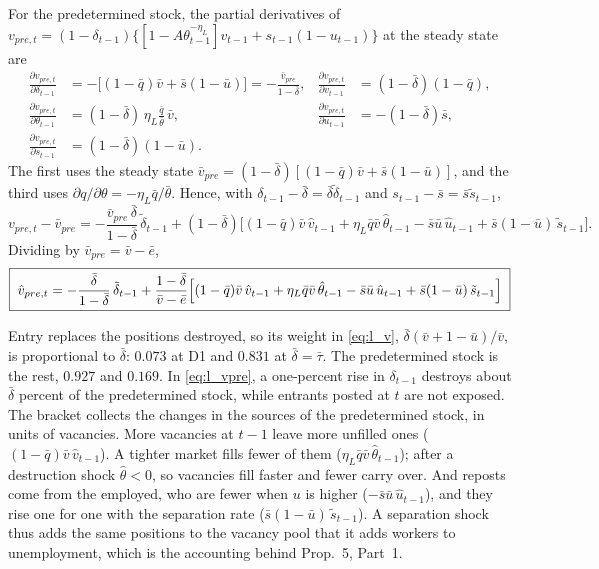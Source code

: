 \documentclass[authoryear, review, 12pt]{elsarticle}
\begin{document}
For the predetermined stock, the partial derivatives of
$v_{pre,t}=(1-\delta_{t-1})\{[1-A\theta_{t-1}^{-\eta_L}]v_{t-1}+s_{t-1}(1-u_{t-1})\}$ at the
steady state are
\begin{align*}
	\frac{\partial v_{pre,t}}{\partial\delta_{t-1}}&=-\bigl[(1-\bar q)\bar v+\bar s(1-\bar u)\bigr]
	=-\frac{\bar v_{pre}}{1-\bar\delta},
	&\frac{\partial v_{pre,t}}{\partial v_{t-1}}&=(1-\bar\delta)(1-\bar q),\\
	\frac{\partial v_{pre,t}}{\partial\theta_{t-1}}&=(1-\bar\delta)\,\eta_L\frac{\bar q}{\bar\theta}\,\bar v,
	&\frac{\partial v_{pre,t}}{\partial u_{t-1}}&=-(1-\bar\delta)\bar s,\\
	\frac{\partial v_{pre,t}}{\partial s_{t-1}}&=(1-\bar\delta)(1-\bar u).
\end{align*}
The first uses the steady state $\bar v_{pre}=(1-\bar\delta)[(1-\bar q)\bar v+\bar s(1-\bar u)]$,
and the third uses $\partial q/\partial\theta=-\eta_L\bar q/\bar\theta$. Hence, with
$\delta_{t-1}-\bar\delta=\bar\delta\tilde\delta_{t-1}$ and $s_{t-1}-\bar s=\bar s\tilde s_{t-1}$,
\[
	v_{pre,t}-\bar v_{pre}
	=-\frac{\bar v_{pre}\,\bar\delta}{1-\bar\delta}\,\tilde\delta_{t-1}
	+(1-\bar\delta)\bigl[(1-\bar q)\bar v\,\hat v_{t-1}+\eta_L\bar q\bar v\,\hat\theta_{t-1}
	-\bar s\bar u\,\hat u_{t-1}+\bar s(1-\bar u)\,\tilde s_{t-1}\bigr].
\]
Dividing by $\bar v_{pre}=\bar v-\bar e$,
\begin{equation}\label{eq:l_vpre}
	\boxed{\;
	\hat v_{pre,t}=-\frac{\bar\delta}{1-\bar\delta}\,\tilde\delta_{t-1}
	+\frac{1-\bar\delta}{\bar v-\bar e}\Bigl[(1-\bar q)\bar v\,\hat v_{t-1}
	+\eta_L\bar q\bar v\,\hat\theta_{t-1}-\bar s\bar u\,\hat u_{t-1}
	+\bar s(1-\bar u)\,\tilde s_{t-1}\Bigr]\;}
\end{equation}

Entry replaces the positions destroyed, so its weight in \eqref{eq:l_v},
$\bar\delta(\bar v+1-\bar u)/\bar v$, is proportional to $\bar\delta$: $0.073$ at D1 and
$0.831$ at $\bar\delta=\bar\tau$. The predetermined stock is the rest, $0.927$ and $0.169$.
In \eqref{eq:l_vpre}, a one-percent rise in $\delta_{t-1}$ destroys about $\bar\delta$
percent of the predetermined stock, while entrants posted at $t$ are not exposed. The
bracket collects the changes in the sources of the predetermined stock, in units of
vacancies. More vacancies at $t-1$ leave more unfilled ones ($(1-\bar q)\bar v\,\hat v_{t-1}$).
A tighter market fills fewer of them ($\eta_L\bar q\bar v\,\hat\theta_{t-1}$); after a
destruction shock $\hat\theta<0$, so vacancies fill faster and fewer carry over. And reposts
come from the employed, who are fewer when $u$ is higher ($-\bar s\bar u\,\hat u_{t-1}$), and
they rise one for one with the separation rate ($\bar s(1-\bar u)\,\tilde s_{t-1}$). A
separation shock thus adds the same positions to the vacancy pool that it adds workers to
unemployment, which is the accounting behind Prop.~5, Part~1.
\end{document}
